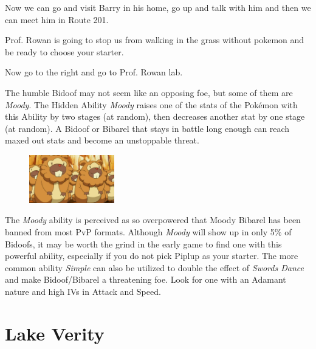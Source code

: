 \documentclass[11pt]{article}
\begin{document}
Now we can go and visit Barry in his home, go up and talk with him
and then we can meet him in Route 201.

Prof. Rowan is going to stop us from walking in the grass without pokemon
and be ready to choose your starter.

Now go to the right and go to Prof. Rowan lab.



\begin{mdframed}[style=MyFrame,nobreak=true,frametitle={Pokemon Spotlight: Bidoof}]

The humble Bidoof may not seem like an opposing foe, but some of them are \emph{Moody}.
The Hidden Ability \emph{Moody} raises one of the stats of the Pokémon with this
Ability by two stages (at random), then decreases another stat by one stage (at random).
A Bidoof or Bibarel that stays in battle long enough can reach maxed out stats
and become an unstoppable threat.

\begin{figure}
\includegraphics[width=0.33\textwidth]{walkthrough/Sinnoh/spotlight-bidoof}
\label{fig:spotlight-bidoof}
\end{figure}

The \emph{Moody} ability is perceived as so overpowered that Moody Bibarel has been
banned from most PvP formats.
Although \emph{Moody} will show up in only 5\% of Bidoofs, it may be worth the
grind in the early game to find one with this powerful ability, especially if
you do not pick Piplup as your starter.
The more common ability \emph{Simple} can also be utilized to double the effect of
\emph{Swords Dance} and make Bidoof/Bibarel a threatening foe.
Look for one with an Adamant nature and high IVs in Attack and Speed.

\end{mdframed}

\section{Lake Verity}\label{sec:Lake_Verity}

\end{document}
